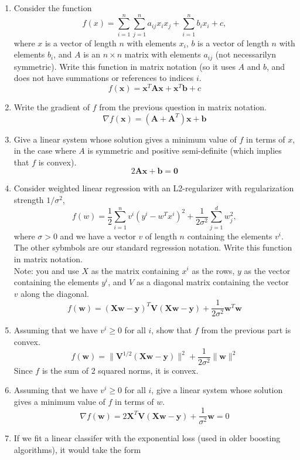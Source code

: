 \documentclass{article}
\def\blu#1{{\color{blu}#1}}
\def\half{\frac 1 2}
\def\enum#1{\begin{enumerate}#1\end{enumerate}}
\begin{document}
\enum{
\item Consider the function
\[
f(x) = \sum_{i=1}^n\sum_{j=1}^n a_{ij}x_ix_j + \sum_{i=1}^n b_ix_i + c,
\]
where $x$ is a vector of length $n$ with elements $x_i$, $b$ is a vector of length $n$ with elements $b_i$, and $A$ is an $n \times n$ matrix with elements $a_{ij}$ (not necessarilyn symmetric). \blu{Write this function in matrix notation} (so it uses $A$ and $b$, and does not have summations or references to indices $i$.
\\
\[f(\mathbf{x}) = \mathbf{x}^T \mathbf{Ax} + \mathbf{x}^T \mathbf{b} + c\]
\item \blu{Write the gradient of $f$ from the previous question in matrix notation}.
\\
\[\nabla f(\mathbf{x}) = (\mathbf{A+A}^T)\mathbf{x} + \mathbf{b}\]
\item \blu{Give a linear system whose solution gives a minimum value of $f$ in terms of $x$}, in the case where $A$ is symmetric and positive semi-definite (which implies that $f$ is convex).
\\
\[2\mathbf{Ax+b=0}\]
\pagebreak
\item Consider weighted linear regression with an L2-regularizer with regularization strength $1/\sigma^2$,
\[
f(w) = \half \sum_{i=1}^n v^i(y^i - w^Tx^i)^2 + \frac{1}{2\sigma^2}\sum_{j=1}^d w_j^2,
\]
where $\sigma > 0$ and we have a vector $v$ of length $n$ containing the elements $v^i$. The other sybmbols are our standard regression notation. \blu{Write this function in matrix notation}.\\
Note: you and use $X$ as the matrix containing $x^i$ as the rows, $y$ as the vector containing the elements $y^i$, and $V$ as a diagonal matrix containing the vector $v$ along the diagonal.
\\
\[f(\mathbf{w}) = \mathbf{(Xw-y)}^T \mathbf{V(Xw-y)} + \frac{1}{2\sigma^2} \mathbf{w}^T \mathbf{w}\]
\item Assuming that we have $v^i \geq 0$ for all $i$, \blu{show that $f$ from the previous part is convex}.
\[f(\mathbf{w}) = \|\mathbf{V}^{1/2} \mathbf{(Xw-y)}\|^2 + \frac{1}{2\sigma^2} \|\mathbf{w}\|^2\]
Since $f$ is the sum of 2 squared norms, it is convex.
\item Assuming that we have $v^i \geq 0$ for all $i$, \blu{give a linear system whose solution gives a minimum value of $f$ in terms of $w$}.
\\
\[\nabla f(\mathbf{w}) = 2\mathbf{X}^T \mathbf{V(Xw-y)} + \frac{1}{\sigma^2} \mathbf{w}=0\]
\pagebreak
\item If we fit a linear classifer with the exponential loss (used in older boosting algorithms), it would take the form
}
\end{document}
